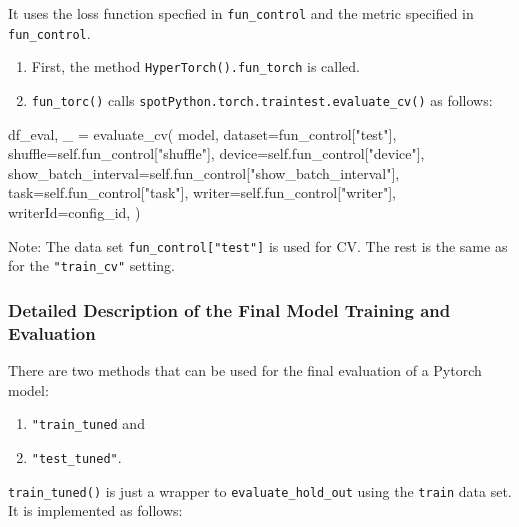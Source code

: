 \documentclass[
  letterpaper,
  DIV=11,
  numbers=noendperiod]{scrreprt}
\newenvironment{Shaded}{\begin{snugshade}}{\end{snugshade}}
\newcommand{\NormalTok}[1]{\textcolor[rgb]{0.00,0.23,0.31}{#1}}
\providecommand{\tightlist}{%
  \setlength{\itemsep}{0pt}\setlength{\parskip}{0pt}}\usepackage{longtable,booktabs,array}
\begin{document}
It uses the loss function specfied in \texttt{fun\_control} and the
metric specified in \texttt{fun\_control}.

\begin{enumerate}
\def\labelenumi{\arabic{enumi}.}
\tightlist
\item
  First, the method \texttt{HyperTorch().fun\_torch} is called.
\item
  \texttt{fun\_torc()} calls
  \texttt{spotPython.torch.traintest.evaluate\_cv()} as follows:
\end{enumerate}

\begin{Shaded}
\begin{Highlighting}[]
\NormalTok{df\_eval, \_ = evaluate\_cv(}
\NormalTok{    model,}
\NormalTok{    dataset=fun\_control["test"],}
\NormalTok{    shuffle=self.fun\_control["shuffle"],}
\NormalTok{    device=self.fun\_control["device"],}
\NormalTok{    show\_batch\_interval=self.fun\_control["show\_batch\_interval"],}
\NormalTok{    task=self.fun\_control["task"],}
\NormalTok{    writer=self.fun\_control["writer"],}
\NormalTok{    writerId=config\_id,}
\NormalTok{)}
\end{Highlighting}
\end{Shaded}

Note: The data set \texttt{fun\_control{[}"test"{]}} is used for CV. The
rest is the same as for the \texttt{"train\_cv"} setting.

\hypertarget{sec-final-model-evaluation}{%
\subsubsection{Detailed Description of the Final Model Training and
Evaluation}\label{sec-final-model-evaluation}}

There are two methods that can be used for the final evaluation of a
Pytorch model:

\begin{enumerate}
\def\labelenumi{\arabic{enumi}.}
\tightlist
\item
  \texttt{"train\_tuned} and
\item
  \texttt{"test\_tuned"}.
\end{enumerate}

\texttt{train\_tuned()} is just a wrapper to
\texttt{evaluate\_hold\_out} using the \texttt{train} data set. It is
implemented as follows:
\end{document}
